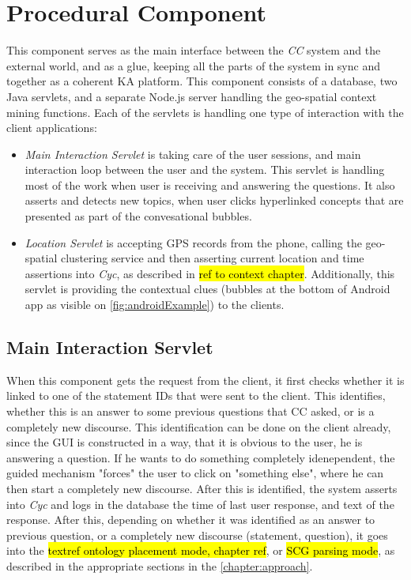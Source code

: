 \section{Procedural Component}
\label{section:prophet}
This component serves as the main interface between the \emph{CC} system and
the external world, and as a glue, keeping all the parts of the system in sync
and together as a coherent KA platform. This component consists of a database,
two Java servlets, and a separate Node.js server handling the geo-spatial 
context mining functions. Each of the servlets is handling one type of 
interaction with the client applications:
\begin{itemize}
\item \emph{Main Interaction Servlet} is taking care of the user sessions, and 
main interaction loop between the user and the system. This servlet is handling
most of the work when user is receiving and answering the questions. It also
asserts and detects new topics, when user clicks hyperlinked concepts that
are presented as part of the convesational bubbles.
\item \emph{Location Servlet} is accepting GPS records from the phone, calling
the geo-spatial clustering service and then asserting current location and 
time assertions into \emph{Cyc}, as described in \hl{ref to context chapter}.
Additionally, this servlet is providing the contextual clues (bubbles at the
bottom of Android app as visible on \autoref{fig:androidExample}) to the 
clients.
\end{itemize}

\subsection{Main Interaction Servlet}
\label{section:mainServlet}
When this component gets the request from the client, it first checks whether
it is linked to one of the statement IDs that were sent to the client. This
identifies, whether this is an answer to some previous questions that CC
asked, or is a completely new discourse. This identification can be done on 
the client already, since the GUI is constructed in a way, that it is obvious
to the user, he is answering a question. If he wants to do something completely
idenependent, the guided mechanism "forces" the user to click on 
"something else", where he can then start a completely new discourse.
After this is identified, the system asserts into  \emph{Cyc} and logs
in the database  the time of last user response, and text of the
response. After this, depending on whether it was identified as an answer to
previous question, or a completely new discourse (statement, question), it goes
into the \hl{textref ontology placement mode, chapter ref}, or \hl{SCG parsing
mode}, as described in the appropriate sections in the 
\autoref{chapter:approach}. 

